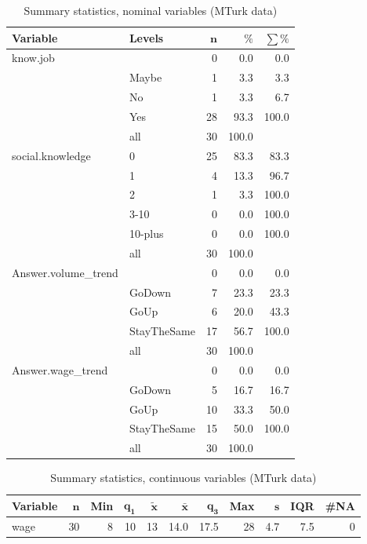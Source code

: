 \documentclass[a4paper,10pt]{article}\usepackage[]{graphicx}\usepackage[]{color}
\begin{document}
\begin{table}[ht]
\centering
{\footnotesize
\begin{tabular}{ll|rrr}
 \textbf{Variable} & \textbf{Levels} & $\mathbf{n}$ & $\mathbf{\%}$ & $\mathbf{\sum \%}$ \\ 
  \hline
know.job &  & 0 & 0.0 & 0.0 \\ 
   & Maybe & 1 & 3.3 & 3.3 \\ 
   & No & 1 & 3.3 & 6.7 \\ 
   & Yes & 28 & 93.3 & 100.0 \\ 
   \hline
 & all & 30 & 100.0 &  \\ 
   \hline
\hline
social.knowledge & 0 & 25 & 83.3 & 83.3 \\ 
   & 1 & 4 & 13.3 & 96.7 \\ 
   & 2 & 1 & 3.3 & 100.0 \\ 
   & 3-10 & 0 & 0.0 & 100.0 \\ 
   & 10-plus & 0 & 0.0 & 100.0 \\ 
   \hline
 & all & 30 & 100.0 &  \\ 
   \hline
\hline
Answer.volume\_trend &  & 0 & 0.0 & 0.0 \\ 
   & GoDown & 7 & 23.3 & 23.3 \\ 
   & GoUp & 6 & 20.0 & 43.3 \\ 
   & StayTheSame & 17 & 56.7 & 100.0 \\ 
   \hline
 & all & 30 & 100.0 &  \\ 
   \hline
\hline
Answer.wage\_trend &  & 0 & 0.0 & 0.0 \\ 
   & GoDown & 5 & 16.7 & 16.7 \\ 
   & GoUp & 10 & 33.3 & 50.0 \\ 
   & StayTheSame & 15 & 50.0 & 100.0 \\ 
   \hline
 & all & 30 & 100.0 &  \\ 
   \hline
\hline
\end{tabular}
}
\caption{Summary statistics, nominal variables (MTurk data)} 
\label{tab1:51-3020}
\end{table}
\begin{table}[ht]
\centering
{\footnotesize
\begin{tabular}{lrrrrrrrrrr}
 \textbf{Variable} & $\mathbf{n}$ & \textbf{Min} & $\mathbf{q_1}$ & $\mathbf{\widetilde{x}}$ & $\mathbf{\bar{x}}$ & $\mathbf{q_3}$ & \textbf{Max} & $\mathbf{s}$ & \textbf{IQR} & \textbf{\#NA} \\ 
  \hline
wage & 30 & 8 & 10 & 13 & 14.0 & 17.5 & 28 & 4.7 & 7.5 & 0 \\ 
  \end{tabular}
}
\caption{Summary statistics, continuous variables (MTurk data)} 
\label{tab2:51-3020}
\end{table}
\end{document}
